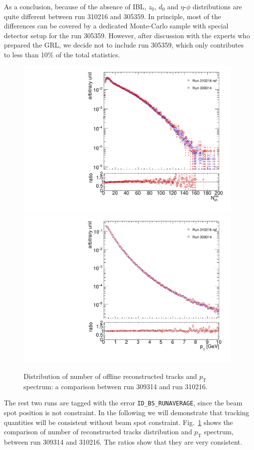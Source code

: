 As a conclusion, because of the absence of IBL, $z_{0}$, $d_{0}$ and $\eta$-$\phi$ distributions are quite different between run 310216 and 305359. In principle, most of the differences can be covered by a dedicated Monte-Carlo sample with special detector setup for the run 305359. However, after discussion with the experts who prepared the GRL, we decide not to include run 305359, which only contributes to less than 10$\%$ of the total statistics.

\begin{figure}[H]
\centering
\includegraphics[width=0.45\linewidth]{figs/sec_evtSlc/GRLpp2016/309314_dis_nTrk.pdf}
\includegraphics[width=0.45\linewidth]{figs/sec_evtSlc/GRLpp2016/309314_dis_pt.pdf}
\caption{Distribution of number of offline reconstructed tracks and $p_{\text{T}}$ spectrum: a comparison between run 309314 and run 310216.}
\label{fig:GRLpp2016_309314_nTrk_pt}
\end{figure}
The rest two runs are tagged with the error \verb|ID_BS_RUNAVERAGE|, since the beam spot position is not constraint. In the following we will demonstrate that tracking quantities will be consistent without beam spot constraint. Fig.~\ref{fig:GRLpp2016_309314_nTrk_pt} shows the comparison of number of reconstructed tracks distribution and $p_{\text{T}}$ spectrum, between run 309314 and 310216. The ratios show that they are very consistent.

